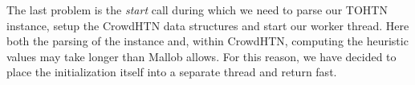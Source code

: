 The last problem is the \textit{start} call during which we need to parse our TOHTN instance, setup the CrowdHTN data structures and start our worker thread. Here both the parsing of the instance and, within CrowdHTN, computing the heuristic values may take longer than Mallob allows. For this reason, we have decided to place the initialization itself into a separate thread and return fast.

